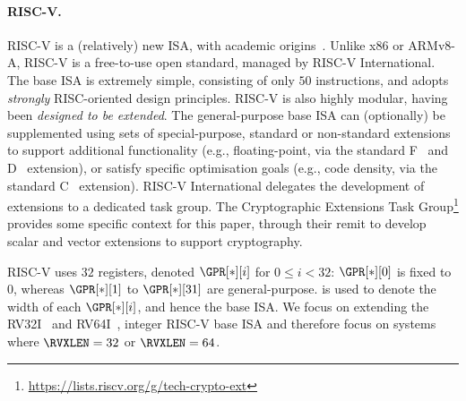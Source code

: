 
\paragraph{RISC-V.}
\label{sec:bg:riscv}

RISC-V is a (relatively) new ISA, with academic origins~\cite{riscv:1,riscv:2}.
Unlike x86 or ARMv8-A, RISC-V is a free-to-use 
open standard, managed by RISC-V International.
The base ISA is extremely simple, consisting of only $50$ instructions,
and adopts {\em strongly} RISC-oriented design principles.
RISC-V is also highly modular, having been {\em designed to be extended}.
The general-purpose base ISA can (optionally) be
supplemented using sets of special-purpose, standard or non-standard
extensions to
support additional functionality 
(e.g., floating-point, 
       via the 
       standard F~\cite[Section 11]{RV:ISA:I:19}
                and
                D~\cite[Section 12]{RV:ISA:I:19}
       extension),
or 
satisfy specific optimisation goals
(e.g., code density, 
       via the 
       standard C~\cite[Section 16]{RV:ISA:I:19}
       extension).
RISC-V International delegates the development of
extensions to a dedicated task group.
The Cryptographic Extensions Task
Group\footnote{
  \url{https://lists.riscv.org/g/tech-crypto-ext}
} provides some specific context for this paper, through their remit to 
develop scalar and vector extensions to support cryptography.

RISC-V uses $32$ registers,
denoted $\GPR[*][ i ]$ for $0 \leq i < 32$:
$
\GPR[*][ 0 ]
$
is fixed to $0$, whereas $\GPR[*][1]$ to $\GPR[*][31]$ are general-purpose.
\RVXLEN is used to denote the width of each $\GPR[*][ i ]$, and hence the base ISA.
We focus on extending the
RV32I~\cite[Section 2]{RV:ISA:I:19}
and 
RV64I~\cite[Section 5]{RV:ISA:I:19},
integer RISC-V base ISA
and therefore focus on systems where 
$\RVXLEN = 32$
or
$\RVXLEN = 64$.

